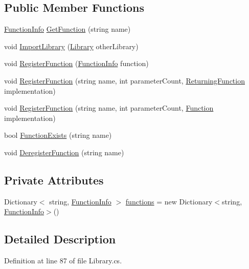 \subsection*{Public Member Functions}
\begin{DoxyCompactItemize}
\item 
\hyperlink{a00096}{Function\-Info} \hyperlink{a00119_aacfb1f00ad8aa3921941b8d8af0960e0}{Get\-Function} (string name)
\item 
void \hyperlink{a00119_ab42a4fd30a72156cafa685f959deef78}{Import\-Library} (\hyperlink{a00119}{Library} other\-Library)
\item 
void \hyperlink{a00119_a001ab29d21fe7db10fc9c250914287f9}{Register\-Function} (\hyperlink{a00096}{Function\-Info} function)
\item 
void \hyperlink{a00119_a2a698de0b528b2bac17bd85f57d45d4b}{Register\-Function} (string name, int parameter\-Count, \hyperlink{a00041_a5177bf74fbfe7303fac9d8236c2e514b}{Returning\-Function} implementation)
\item 
void \hyperlink{a00119_a6820eaa082077f16496effbc9041b7ad}{Register\-Function} (string name, int parameter\-Count, \hyperlink{a00041_ae0be2e5cf13d5779816102439e61ff1a}{Function} implementation)
\item 
bool \hyperlink{a00119_a6c9a1cc3e25b6aae25e210d8a0d68c09}{Function\-Exists} (string name)
\item 
void \hyperlink{a00119_a47d1b3664733207d5cda15f4a4a7af7a}{Deregister\-Function} (string name)
\end{DoxyCompactItemize}
\subsection*{Private Attributes}
\begin{DoxyCompactItemize}
\item 
Dictionary$<$ string, \hyperlink{a00096}{Function\-Info} $>$ \hyperlink{a00119_a2fcc78a63963be5320cf09783b66fab6}{functions} = new Dictionary$<$string, \hyperlink{a00096}{Function\-Info}$>$()
\end{DoxyCompactItemize}


\subsection{Detailed Description}


Definition at line 87 of file Library.\-cs.




